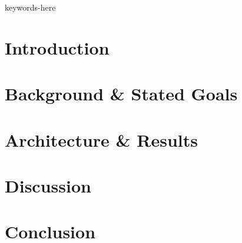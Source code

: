\documentclass[conference]{IEEEtran}
\begin{document}
\maketitle

\begin{abstract}

\end{abstract}

\begin{IEEEkeywords}
    keywords-here	
\end{IEEEkeywords}  

\section{Introduction}


\section{Background \& Stated Goals}


\section{Architecture \& Results}


\section{Discussion}


\section{Conclusion}





\end{document}
